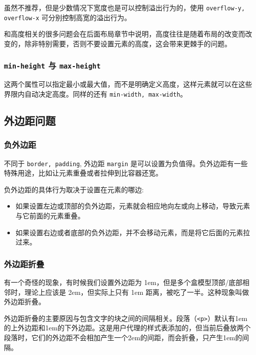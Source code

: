 虽然不推荐，但是少数情况下宽度也是可以控制溢出行为的，使用 \texttt{overflow-y, overflow-x} 可分别控制高宽的溢出行为。

和高度相关的很多问题会在后面布局章节中说明，高度往往是随着布局的改变而改变的，除非特别需要，否则不要设置元素的高度，这会带来更棘手的问题。

\subsubsection*{\texttt{min-height} 与 \texttt{max-height}}

这两个属性可以指定最小或最大值，而不是明确定义高度，这样元素就可以在这些界限内自动决定高度。同样的还有 \texttt{min-width, max-width}。

\subsection{外边距问题}

\subsubsection*{负外边距}

不同于 \texttt{border, padding}, 外边距 \texttt{margin} 是可以设置为负值得。负外边距有一些特殊用途，比如让元素重叠或者拉伸到比容器还宽。

负外边距的具体行为取决于设置在元素的哪边:
\begin{itemize}
    \item 如果设置左边或顶部的负外边距，元素就会相应地向左或向上移动，导致元素与它前面的元素重叠。
    \item 如果设置右边或者底部的负外边距，并不会移动元素，而是将它后面的元素拉过来。
\end{itemize}


\subsubsection*{外边距折叠}

有一个奇怪的现象，有时候我们设置外边距为 1em，但是多个盒模型顶部/底部相邻时，理论上应该是 2em，但实际上只有 1em 距离，被吃了一半。这种现象叫做外边距折叠。

外边距折叠的主要原因与包含文字的块之间的间隔相关。段落（\texttt{<p>}）默认有1em的上外边距和1em的下外边距。这是用户代理的样式表添加的，但当前后叠放两个段落时，它们的外边距不会相加产生一个2em的间距，而会折叠，只产生1em的间隔。

